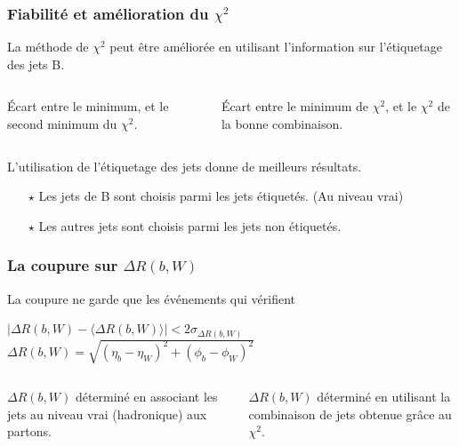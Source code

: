 \documentclass[usepdftitle=false,green]{beamer}
\begin{document}
\begin{frame}
	\frametitle{Fiabilité et amélioration du $\chi^2$}
	La méthode de $\chi^2$ peut être améliorée en utilisant l'information sur l'étiquetage des jets B.
	\begin{columns}
		\begin{column}{6.2cm}
			\'Ecart entre le minimum, et le second minimum du $\chi^2$.
			\begin{figure}
				\vspace{-4ex}
			\end{figure}
		\end{column}
		\begin{column}{6.2cm}
			\'Ecart entre le minimum de $\chi^2$, et le $\chi^2$ de la bonne combinaison.
			\begin{figure}
				\vspace{-4ex}
			\end{figure}
		\end{column}
	\end{columns}
	L'utilisation de l'étiquetage des jets donne de meilleurs résultats.\\
	\begin{itemize}
		\item[$\star$] Les jets de B sont choisis parmi les jets étiquetés. {\scriptsize (Au niveau vrai)}
		\item[$\star$] Les autres jets sont choisis parmi les jets non étiquetés.
	\end{itemize}	 
\end{frame}

\begin{frame}
	\frametitle{La coupure sur $\Delta R(b,W)$}
	La coupure ne garde que les événements qui vérifient
	\vspace{-1ex}	
	\begin{center}
		$ |\Delta R(b,W) - \langle \Delta R(b,W) \rangle | < 2\sigma_{\Delta R(b,W)}$\\
		$\Delta R(b,W) = \sqrt{(\eta_b-\eta_W)^2 + (\phi_b-\phi_W)^2}$
	\end{center}
	\vspace{-7ex}
	\begin{columns}
		\begin{column}{6.2cm}
			\begin{figure}
			\end{figure}
			$\Delta R(b,W)$ déterminé en associant les jets au niveau vrai {\scriptsize(hadronique)} aux partons. %
		\end{column}
		\begin{column}{6.2cm}
			\begin{figure}
			\end{figure}
			$\Delta R(b,W)$ déterminé en utilisant la combinaison de jets obtenue grâce au $\chi^2$. %
		\end{column}
	\end{columns}
\end{frame}
\end{document}
